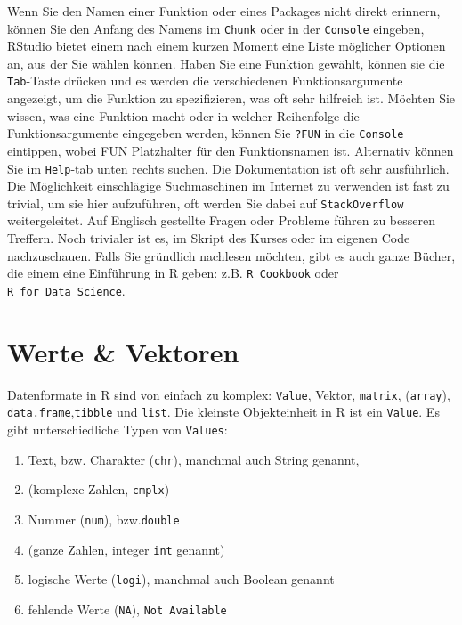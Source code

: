 \documentclass[
]{book}
\providecommand{\tightlist}{%
  \setlength{\itemsep}{0pt}\setlength{\parskip}{0pt}}
\theoremstyle{definition}
\theoremstyle{definition}
\theoremstyle{definition}
\theoremstyle{definition}
\theoremstyle{remark}
\begin{document}
Wenn Sie den Namen einer Funktion oder eines Packages nicht direkt erinnern, können Sie den Anfang des Namens im \texttt{Chunk} oder in der \texttt{Console} eingeben, RStudio bietet einem nach einem kurzen Moment eine Liste möglicher Optionen an, aus der Sie wählen können. Haben Sie eine Funktion gewählt, können sie die \texttt{Tab}-Taste drücken und es werden die verschiedenen Funktionsargumente angezeigt, um die Funktion zu spezifizieren, was oft sehr hilfreich ist. Möchten Sie wissen, was eine
Funktion macht oder in welcher Reihenfolge die Funktionsargumente eingegeben werden, können Sie \texttt{?FUN} in die \texttt{Console} eintippen, wobei FUN Platzhalter für den Funktionsnamen ist. Alternativ können Sie im \texttt{Help}-tab unten rechts suchen. Die Dokumentation ist oft sehr ausführlich. Die Möglichkeit einschlägige Suchmaschinen im Internet zu verwenden ist fast zu trivial, um sie hier aufzuführen, oft werden Sie dabei auf \texttt{StackOverflow} weitergeleitet. Auf Englisch gestellte Fragen
oder Probleme führen zu besseren Treffern. Noch trivialer ist es, im Skript des Kurses oder im eigenen Code nachzuschauen. Falls Sie gründlich nachlesen möchten, gibt es auch ganze Bücher, die einem eine Einführung in R geben: z.B. \texttt{R\ Cookbook} oder \texttt{R\ for\ Data\ Science}.

\hypertarget{werte-vektoren}{%
\section{Werte \& Vektoren}\label{werte-vektoren}}

Datenformate in R sind von einfach zu komplex: \texttt{Value}, Vektor, \texttt{matrix}, (\texttt{array}), \texttt{data.frame},\texttt{tibble} und \texttt{list}. Die kleinste Objekteinheit in R ist ein \texttt{Value}. Es gibt unterschiedliche Typen von \texttt{Values}:

\begin{enumerate}
\def\labelenumi{\arabic{enumi}.}
\tightlist
\item
  Text, bzw. Charakter (\texttt{chr}), manchmal auch String genannt,
\item
  (komplexe Zahlen, \texttt{cmplx})
\item
  Nummer (\texttt{num}), bzw.\texttt{double}
\item
  (ganze Zahlen, integer \texttt{int} genannt)
\item
  logische Werte (\texttt{logi}), manchmal auch Boolean genannt
\item
  fehlende Werte (\texttt{NA}), \texttt{Not\ Available}
\end{enumerate}
\end{document}
